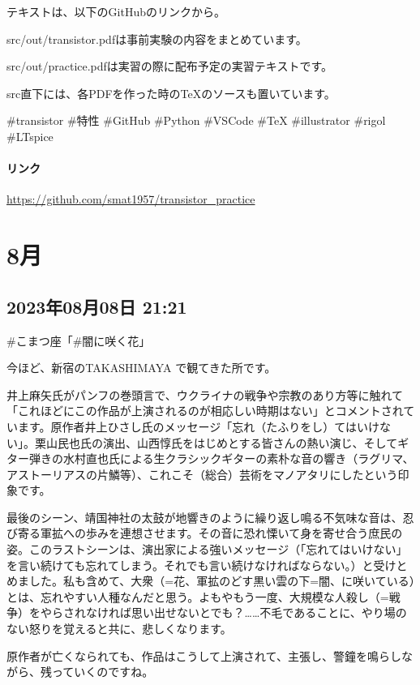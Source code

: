 テキストは、以下のGitHubのリンクから。

src/out/transistor.pdfは事前実験の内容をまとめています。

src/out/practice.pdfは実習の際に配布予定の実習テキストです。

src直下には、各PDFを作った時のTeXのソースも置いています。

\#transistor \#特性 \#GitHub \#Python \#VSCode \#TeX \#illustrator \#rigol \#LTspice

\paragraph{リンク}
\url{https://github.com/smat1957/transistor_practice}

\section{8月}

\subsection*{2023年08月08日 21:21}

\#こまつ座「\#闇に咲く花」

今ほど、新宿のTAKASHIMAYA で観てきた所です。

井上麻矢氏がパンフの巻頭言で、ウクライナの戦争や宗教のあり方等に触れて「これほどにこの作品が上演されるのが相応しい時期はない」とコメントされています。原作者井上ひさし氏のメッセージ「忘れ（たふりをし）てはいけない」。栗山民也氏の演出、山西惇氏をはじめとする皆さんの熱い演じ、そしてギター弾きの水村直也氏による生クラシックギターの素朴な音の響き（ラグリマ、アストーリアスの片鱗等）、これこそ（総合）芸術をマノアタリにしたという印象です。

最後のシーン、靖国神社の太鼓が地響きのように繰り返し鳴る不気味な音は、忍び寄る軍拡への歩みを連想させます。その音に恐れ慄いて身を寄せ合う庶民の姿。このラストシーンは、演出家による強いメッセージ（「忘れてはいけない」を言い続けても忘れてしまう。それでも言い続けなければならない。）と受けとめました。私も含めて、大衆（=花、軍拡のどす黒い雲の下=闇、に咲いている）とは、忘れやすい人種なんだと思う。よもやもう一度、大規模な人殺し（=戦争）をやらされなければ思い出せないとでも？……不毛であることに、やり場のない怒りを覚えると共に、悲しくなります。

原作者が亡くなられても、作品はこうして上演されて、主張し、警鐘を鳴らしながら、残っていくのですね。

